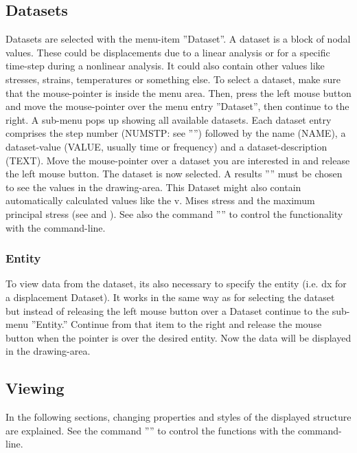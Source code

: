 \documentclass{article}
\begin{document}
\subsection{\label{Datasets}Datasets}
Datasets are selected with the menu-item ''Dataset''. A dataset is a block of nodal values. These could be displacements due to a linear analysis or for a specific time-step during a nonlinear analysis. It could also contain other values like stresses, strains, temperatures or something else. To select a dataset, make sure that the mouse-pointer is inside the menu area. Then, press the left mouse button and move the mouse-pointer over the menu entry ''Dataset'', then continue to the right. A sub-menu pops up showing all available datasets. Each dataset entry comprises the step number (NUMSTP: see '''') followed by the name (NAME), a dataset-value (VALUE, usually time or frequency) and a dataset-description (TEXT). Move the mouse-pointer over a dataset you are interested in and release the left mouse button. The dataset is now selected. A results '''' must be chosen to see the values in the drawing-area. This Dataset might also contain automatically calculated values like the v. Mises stress and the maximum principal stress (see  and ). See also the command '''' to control the functionality with the command-line.

\subsubsection{\label{Entity}Entity}
To view data from the dataset, its also necessary to specify the entity (i.e. dx for a displacement Dataset). It works in the same way as for selecting the dataset but instead of releasing the left mouse button over a Dataset continue to the sub-menu ''Entity.''  Continue from that item to the right and release the mouse button when the pointer is over the desired entity.  Now the data will be displayed in the drawing-area.

\subsection{\label{Viewing}Viewing}
In the following sections, changing properties and styles of the displayed structure are explained. See the command '''' to control the functions with the command-line.
\end{document}
